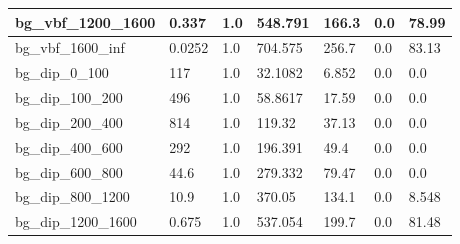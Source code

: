\documentclass[a4paper, 10pt]{article}
\begin{document}
\begin{table}[H]
\begin{center}
\begin{tabular}{|m{23.0mm}|m{23.0mm}|m{18.0mm}|m{19.0mm}|m{19.0mm}|m{19.0mm}|m{19.0mm}|}
      \hline
      {\cellcolor{white}         bg\_vbf\_1200\_1600}& {\cellcolor{white}         0.337}& {\cellcolor{white}         1.0}& {\cellcolor{white}         548.791}& {\cellcolor{white}         166.3}& {\cellcolor{red}         0.0}& {\cellcolor{red}         78.99}\\
      \hline
      {\cellcolor{white}         bg\_vbf\_1600\_inf}& {\cellcolor{white}         0.0252}& {\cellcolor{white}         1.0}& {\cellcolor{white}         704.575}& {\cellcolor{white}         256.7}& {\cellcolor{red}         0.0}& {\cellcolor{red}         83.13}\\
      \hline
      {\cellcolor{white}         bg\_dip\_0\_100}& {\cellcolor{white}         117}& {\cellcolor{white}         1.0}& {\cellcolor{white}         32.1082}& {\cellcolor{white}         6.852}& {\cellcolor{green}         0.0}& {\cellcolor{green}         0.0}\\
      \hline
      {\cellcolor{white}         bg\_dip\_100\_200}& {\cellcolor{white}         496}& {\cellcolor{white}         1.0}& {\cellcolor{white}         58.8617}& {\cellcolor{white}         17.59}& {\cellcolor{green}         0.0}& {\cellcolor{green}         0.0}\\
      \hline
      {\cellcolor{white}         bg\_dip\_200\_400}& {\cellcolor{white}         814}& {\cellcolor{white}         1.0}& {\cellcolor{white}         119.32}& {\cellcolor{white}         37.13}& {\cellcolor{green}         0.0}& {\cellcolor{green}         0.0}\\
      \hline
      {\cellcolor{white}         bg\_dip\_400\_600}& {\cellcolor{white}         292}& {\cellcolor{white}         1.0}& {\cellcolor{white}         196.391}& {\cellcolor{white}         49.4}& {\cellcolor{green}         0.0}& {\cellcolor{green}         0.0}\\
      \hline
      {\cellcolor{white}         bg\_dip\_600\_800}& {\cellcolor{white}         44.6}& {\cellcolor{white}         1.0}& {\cellcolor{white}         279.332}& {\cellcolor{white}         79.47}& {\cellcolor{green}         0.0}& {\cellcolor{green}         0.0}\\
      \hline
      {\cellcolor{white}         bg\_dip\_800\_1200}& {\cellcolor{white}         10.9}& {\cellcolor{white}         1.0}& {\cellcolor{white}         370.05}& {\cellcolor{white}         134.1}& {\cellcolor{orange}         0.0}& {\cellcolor{orange}         8.548}\\
      \hline
      {\cellcolor{white}         bg\_dip\_1200\_1600}& {\cellcolor{white}         0.675}& {\cellcolor{white}         1.0}& {\cellcolor{white}         537.054}& {\cellcolor{white}         199.7}& {\cellcolor{red}         0.0}& {\cellcolor{red}         81.48}\\

\end{tabular}
\end{center}
\end{table}
\end{document}
